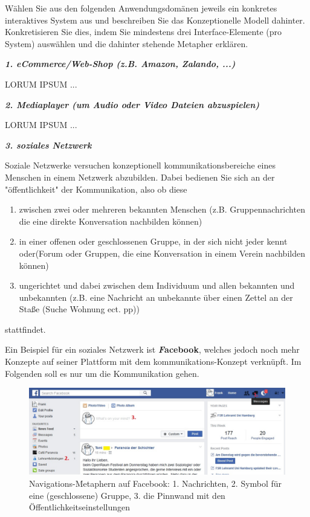 \documentclass[a4paper,10pt]{article}
\begin{document}
\kopf
\renewcommand{\figurename}{Figure}

Wählen Sie aus den folgenden Anwendungsdomänen jeweils ein konkretes interaktives System aus und beschreiben Sie das Konzeptionelle Modell dahinter. Konkretisieren Sie dies, indem Sie mindestens drei Interface-Elemente (pro System) auswählen und die dahinter stehende Metapher erklären. \newline
 
\textbf{\textit{1. eCommerce/Web-Shop (z.B. Amazon, Zalando, ...)}} \newline

LORUM IPSUM ... \newline

\textbf{\textit{2. Mediaplayer (um Audio oder Video Dateien abzuspielen)}} \newline

LORUM IPSUM ... \newline

\textbf{\textit{3. soziales Netzwerk}} \newline

Soziale Netzwerke versuchen konzeptionell kommunikationsbereiche eines Menschen in einem Netzwerk abzubilden. Dabei bedienen Sie sich an der "öffentlichkeit" der Kommunikation, also ob diese
\begin{enumerate}
\item zwischen zwei oder mehreren bekannten Menschen (z.B. Gruppennachrichten die eine direkte Konversation nachbilden können)
\item in einer offenen oder geschlossenen Gruppe, in der sich nicht jeder kennt oder(Forum oder Gruppen, die eine Konversation in einem Verein nachbilden können)
\item ungerichtet und dabei zwischen dem Individuum und allen bekannten und unbekannten (z.B. eine Nachricht an unbekannte über einen Zettel an der Staße (Suche Wohnung ect. pp))
\end{enumerate}

stattfindet. \newline

Ein Beispiel für ein soziales Netzwerk ist \textbf{\textit Facebook}, welches jedoch noch mehr Konzepte auf seiner Plattform mit dem kommunikations-Konzept verknüpft. Im Folgenden soll es nur um die Kommunikation gehen.

\begin{figure}[ht]
\centering \includegraphics[width=1\textwidth]{facebook.jpg}
\caption{Navigations-Metaphern auf Facebook: 1. Nachrichten, 2. Symbol für eine (geschlossene) Gruppe, 3. die Pinnwand mit den Öffentlichkeitseinstellungen}
\end{figure}
\end{document}
